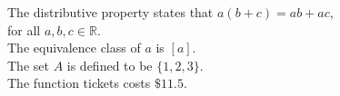 \documentclass[11pt]{article}
\begin{document}
The distributive property states that $a(b+c) = ab + ac$, \\
for all $a, b, c \in \mathbb{R}$. \\[6pt]

The equivalence class of $a$ is $[a]$. \\ [6pt]

The set $A$ is defined to be $\{1, 2, 3\}$.\\[6pt]
The function tickets costs $\$11.5$.
\end{document}
